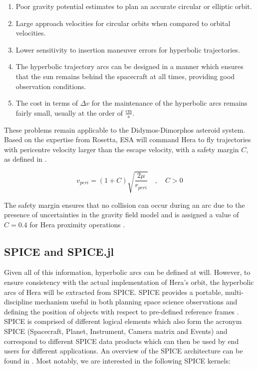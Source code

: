 \begin{enumerate}
	\item Poor gravity potential estimates to plan an accurate circular or elliptic orbit.
	\item Large approach velocities for circular orbits when compared to orbital velocities.
	\item Lower sensitivity to insertion maneuver errors for hyperbolic trajectories. 
	\item The hyperbolic trajectory arcs can be designed in a manner which ensures that the sun remains behind the spacecraft at all times, providing good observation conditions. 
	\item The cost in terms of $\Delta v$ for the maintenance of the hyperbolic arcs remains fairly small, usually at the order of $\frac{\si{\centi\meter}}{\si{\second}}$.
\end{enumerate}

These problems remain applicable to the Didymos-Dimorphos asteroid system. Based on the expertise from Rosetta, ESA will command Hera to fly trajectories with pericentre velocity larger than the escape velocity, with a safety margin $C$, as defined in  \cite{hera-autonomous-ops}.

\begin{equation}
	\label{eq:hera_velocity}
	v_{p e r i}=(1+C) \sqrt{\frac{2 \mu}{r_{p e r i}}} \quad, \quad C>0
\end{equation}

The safety margin ensures that no collision can occur during an arc due to the presence of uncertainties in the gravity field model and is assigned a value of $C=0.4$ for Hera proximity operations \cite{hera-autonomous-ops}.

\subsection{SPICE and SPICE.jl}
\label{sec:spice}

Given all of this information, hyperbolic arcs can be defined at will. However, to ensure consistency with the actual implementation of Hera's orbit, the hyperbolic arcs of Hera will be extracted from SPICE. SPICE provides a portable, multi-discipline mechanism useful in both planning space science observations and defining the position of objects with respect to pre-defined reference frames \cite{SPICE}. SPICE is comprised of different logical elements which also form the acronym SPICE (Spacecraft, Planet, Instrument, Camera matrix and Events) and correspond to different SPICE data products which can then be used by end users for different applications\cite{SPICE}. An overview of the SPICE architecture can be found in . Most notably, we are interested in the following SPICE kernels:

